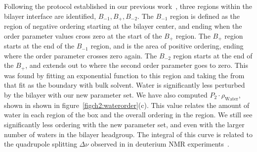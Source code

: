 Following the protocol established in our previous work~\cite{saunders:2019}, 
three regions within the bilayer interface are identified, $B_{-1}, B_{+}, B_{-2}$. 
The $B_{-1}$ region is defined as the region of negative ordering starting at the bilayer center, and ending 
    when the order parameter values cross zero at the start of the $B_{+}$ 
    region. The $B_{+}$ region starts at the end of the $B_{-1}$ region, and 
    is the area of positive ordering, ending where the order parameter crosses
    zero again. The $B_{-2}$ region starts at the end of the $B_{+}$, and extends out to where the 
    second order parameter goes to zero. This was found by fitting an exponential function to this region 
    and taking the  from that fit as the boundary with bulk solvent.
Water is significantly less perturbed by the bilayer with our new parameter set.  
We have also computed $P_2\cdot\rho_{\text{Water}}$, shown in shown in figure~\ref{figch2:waterorder}(c). 
This value relates the amount of water in each region of the box and 
the overall ordering in the region. 
We still see significantly less ordering with the new parameter set, 
and even with the larger number of waters in the bilayer headgroup. 
The integral of this curve is related to the quadrupole splitting $\Delta \nu$ observed in
in deuterium NMR experiments~\cite{aaman:2003,kruczek:2017}.

